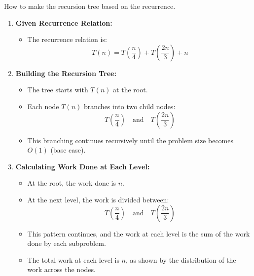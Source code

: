     \begin{intuition}
        How to make the recursion tree based on the recurrence.
    \end{intuition}

    \begin{example}
        \begin{enumerate}
            \item \textbf{Given Recurrence Relation:}
            \begin{itemize}
                \item The recurrence relation is:
                \[
                T(n) = T\left(\frac{n}{4}\right) + T\left(\frac{2n}{3}\right) + n
                \]
            \end{itemize}
            
            \item \textbf{Building the Recursion Tree:}
            \begin{itemize}
                \item The tree starts with \( T(n) \) at the root.
                \item Each node \( T(n) \) branches into two child nodes:
                \[
                T\left(\frac{n}{4}\right) \quad \text{and} \quad T\left(\frac{2n}{3}\right)
                \]
                \item This branching continues recursively until the problem size becomes $O(1)$ (base case).
            \end{itemize}
            
            \item \textbf{Calculating Work Done at Each Level:}
            \begin{itemize}
                \item At the root, the work done is \( n \).
                \item At the next level, the work is divided between:
                \[
                T\left(\frac{n}{4}\right) \quad \text{and} \quad T\left(\frac{2n}{3}\right)
                \]
                \item This pattern continues, and the work at each level is the sum of the work done by each subproblem.
                \item The total work at each level is \( n \), as shown by the distribution of the work across the nodes.
            \end{itemize}
            

\end{enumerate}
\end{example}
